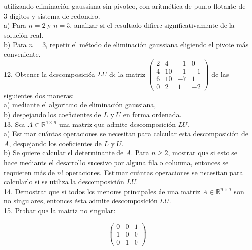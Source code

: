 \documentclass[10pt]{article}
\begin{document}
utilizando eliminación gaussiana sin pivoteo, con aritmética de punto flotante de 3 dígitos y sistema de redondeo.\\
a) Para $n=2$ y $n=3$, analizar si el resultado difiere significativamente de la solución real.\\
b) Para $n=3$, repetir el método de eliminación gaussiana eligiendo el pivote más conveniente.\\
12. Obtener la descomposición $L U$ de la matriz $\left(\begin{array}{cccc}2 & 4 & -1 & 0 \\ 4 & 10 & -1 & -1 \\ 6 & 10 & -7 & 1 \\ 0 & 2 & 1 & -2\end{array}\right)$ de las siguientes dos maneras:\\
a) mediante el algoritmo de eliminación gaussiana,\\
b) despejando los coeficientes de $L$ y $U$ en forma ordenada.\\
13. Sea $A \in \mathbb{R}^{n \times n}$ una matriz que admite descomposición $L U$.\\
a) Estimar cuántas operaciones se necesitan para calcular esta descomposición de $A$, despejando los coeficientes de $L$ y $U$.\\
b) Se quiere calcular el determinante de $A$. Para $n \geq 2$, mostrar que si esto se hace mediante el desarrollo sucesivo por alguna fila o columna, entonces se requieren más de $n!$ operaciones. Estimar cuántas operaciones se necesitan para calcularlo si se utiliza la descomposición $L U$.\\
14. Demostrar que si todos los menores principales de una matriz $A \in \mathbb{R}^{n \times n}$ son no singulares, entonces ésta admite descomposición $L U$.\\
15. Probar que la matriz no singular:

$$
\left(\begin{array}{lll}
0 & 0 & 1 \\
1 & 0 & 0 \\
0 & 1 & 0
\end{array}\right)
$$
\end{document}
